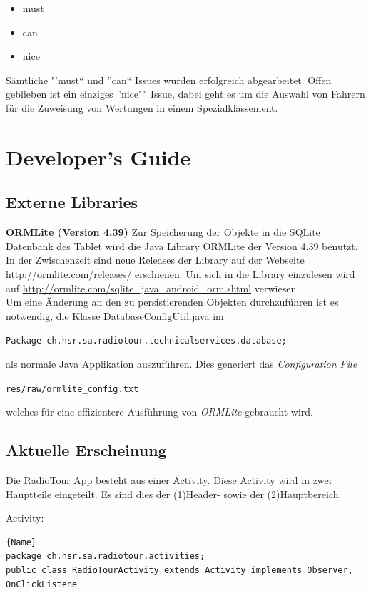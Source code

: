 \begin{itemize}
\item must
\item can
\item nice
\end{itemize}

Sämtliche "'must"` und "'can"` Issues wurden erfolgreich abgearbeitet. Offen geblieben ist ein einziges "'nice"` Issue, dabei geht es um die Auswahl von Fahrern für die Zuweisung von Wertungen in einem Spezialklassement.

\section{Developer's Guide}
\label{ref:devguide}
\subsection{Externe Libraries}
\textbf{ORMLite (Version 4.39)}
Zur Speicherung der Objekte in die SQLite Datenbank des Tablet wird die Java Library ORMLite der Version 4.39 benutzt. In der Zwischenzeit sind neue Releases der Library auf der Webseite \url{http://ormlite.com/releases/} erschienen. Um sich in die Library einzulesen wird auf \url{http://ormlite.com/sqlite_java_android_orm.shtml} verwiesen.
\\
Um eine Änderung an den zu persistierenden Objekten durchzuführen ist es notwendig, die Klasse DatabaseConfigUtil.java im

\lstinline|Package ch.hsr.sa.radiotour.technicalservices.database;|

als normale Java Applikation auszuführen. Dies generiert das \textit{Configuration File}

\lstinline|res/raw/ormlite_config.txt|

welches für eine effizientere Ausführung von \textit{ORMLite} gebraucht wird.

\subsection{Aktuelle Erscheinung}
Die RadioTour App besteht aus einer Activity. Diese Activity wird in zwei Hauptteile eingeteilt. Es sind dies der (1)Header- sowie der (2)Hauptbereich. 

Activity:
\begin{lstlisting}{Name}
package ch.hsr.sa.radiotour.activities;
public class RadioTourActivity extends Activity implements Observer, OnClickListene
\end{lstlisting}


